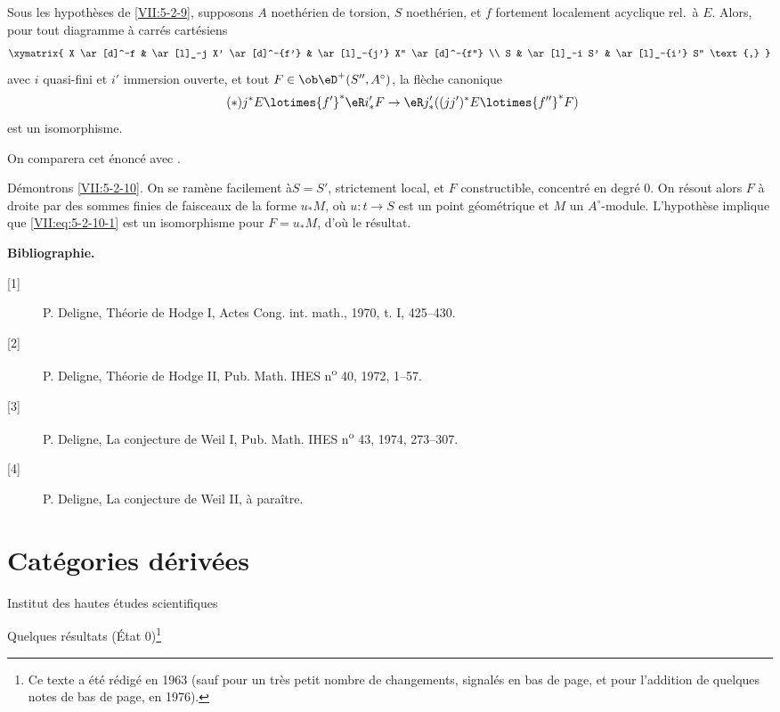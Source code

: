 \begin{proposition}\label{VII:5-2-10}
Sous les hypothèses de \ref{VII:5-2-9}, supposons $A$ noethérien de 
torsion, $S$ noethérien, et $f$ fortement localement acyclique rel.\ à $E$. 
Alors, pour tout diagramme à carrés cartésiens 
\[\xymatrix{
  X \ar[d]^-f 
    & \ar[l]_-j X' \ar[d]^-{f'} 
    & \ar[l]_-{j'} X'' \ar[d]^-{f''} \\
  S 
    & \ar[l]_-i S' 
    & \ar[l]_-{i'} S'' \text{,} 
}\]
avec $i$ quasi-fini et $i'$ immersion ouverte, et tout 
$F\in\ob\eD^+(S'',A^\circ)$, la flèche canonique 
\begin{equation*}\tag{$*$}\label{VII:eq:5-2-10-1}
  j^\ast E \lotimes {f'}^\ast \eR i_\ast' F \to \eR j_\ast' ((j j')^\ast E\lotimes {f''}^\ast F) 
\end{equation*}
est un isomorphisme. 
\end{proposition}

On comparera cet énoncé avec . 

Démontrons \ref{VII:5-2-10}. On se ramène facilement à$S=S'$, 
strictement local, et $F$ constructible, concentré en degré $0$. On 
résout alors $F$ à droite par des sommes finies de faisceaux de la forme 
$u_\ast M$, où $u:t\to S$ est un point géométrique et $M$ un 
$A^\circ$-module. L'hypothèse implique que \eqref{VII:eq:5-2-10-1} est un 
isomorphisme pour $F=u_\ast M$, d'où le résultat. 





\begin{center}\textbf{Bibliographie.}\end{center}
\begin{description}
\item[{[1]}] P. Deligne, Théorie de Hodge I, Actes Cong. int. math., 1970, t. I, 425--430.
\item[{[2]}] P. Deligne, Théorie de Hodge II, Pub. Math. IHES n\textsuperscript{o} 40, 1972, 1--57.
\item[{[3]}] P. Deligne, La conjecture de Weil I, Pub. Math. IHES n\textsuperscript{o} 43, 1974, 273--307.
\item[{[4]}] P. Deligne, La conjecture de Weil II, à paraître.
\end{description}



\chapter{Catégories dérivées}\label{VIII}
\begin{center}Institut des hautes études scientifiques\end{center}
Quelques résultats (État 0)\footnote{Ce texte a été rédigé en 1963 (sauf pour un très petit nombre de changements, signalés en bas de page, et pour l'addition de quelques notes de bas de page, en 1976).}










